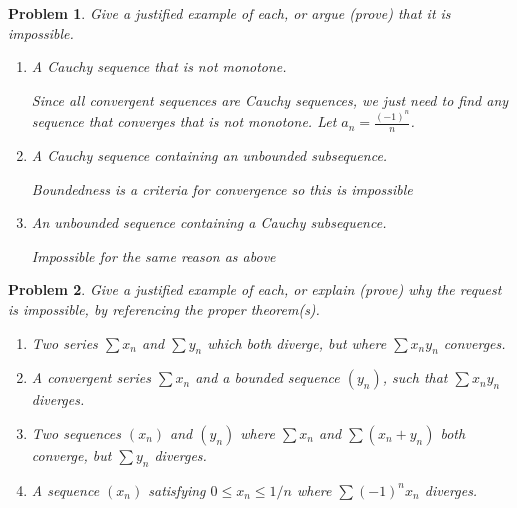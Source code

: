 \documentclass[12pt]{article}
\newtheorem{problem}{Problem}
\begin{document}
\begin{problem} %
Give a justified example of each, or argue (prove) that it is impossible.

\renewcommand{\labelenumi}{(\alph{enumi})}
\begin{enumerate}
\item A Cauchy sequence that is not monotone.

Since all convergent sequences are Cauchy sequences, we just need to find any sequence that converges that is not monotone.
Let $a_n = \frac{(-1)^n}{n}$. 

\item A Cauchy sequence containing an unbounded subsequence.

Boundedness is a criteria for convergence so this is impossible

\item An unbounded sequence containing a Cauchy subsequence.

Impossible for the same reason as above

\end{enumerate}
\end{problem}


\begin{problem} %
Give a justified example of each, or explain (prove) why the request is impossible, by referencing the proper theorem(s).

\renewcommand{\labelenumi}{(\alph{enumi})}
\begin{enumerate}
\item Two series $\sum x_n$ and $\sum y_n$ which both diverge, but where $\sum x_n y_n$ converges.


\item A convergent series $\sum x_n$ and a bounded sequence $(y_n)$, such that $\sum x_n y_n$ diverges.


\item Two sequences $(x_n)$ and $(y_n)$ where $\sum x_n$ and $\sum (x_n+y_n)$ both converge, but $\sum y_n$ diverges.


\item A sequence $(x_n)$ satisfying $0\le x_n \le 1/n$ where $\sum (-1)^n x_n$ diverges.


\end{enumerate}
\end{problem}
\end{document}
